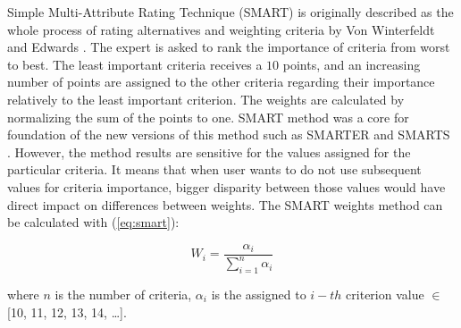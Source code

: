 Simple Multi-Attribute Rating Technique (SMART) is originally described as the whole process of rating alternatives and weighting criteria by Von Winterfeldt and Edwards \cite{olson2004comparison}. The expert is asked to rank the importance of criteria from worst to best. The least important criteria receives a $10$ points, and an increasing number of points are assigned to the other criteria regarding their importance relatively to the least important criterion. The weights are calculated by normalizing the sum of the points to one. SMART method was a core for foundation of the new versions of this method such as SMARTER \cite{tavana2004subjective} and SMARTS \cite{haddad2014smarts}. However, the method results are sensitive for the values assigned for the particular criteria. It means that when user wants to do not use subsequent values for criteria importance, bigger disparity between those values would have direct impact on differences between weights. The SMART weights method can be calculated with (\ref{eq:smart}):

\begin{equation}
    W_i = \frac{\alpha_i}{\sum^{n}_{i=1} \alpha_i}
\label{eq:smart}
\end{equation}

where $n$ is the number of criteria, $\alpha_i$ is the assigned to $i-th$ criterion value $\in$ [10, 11, 12, 13, 14, \ldots]. \\
